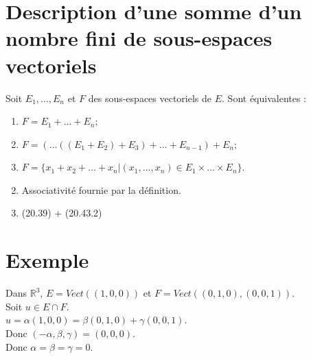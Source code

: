 \documentclass[../main.tex]{subfiles}
\begin{document}
\section{Description d'une somme d'un nombre fini de sous-espaces vectoriels}
\begin{tcolorbox}[title=Propostion 20.43, title filled=false, colframe=lightblue, colback=lightblue!10!white]
    Soit $E_1, \ldots, E_n$ et $F$ des sous-espaces vectoriels de $E$. Sont équivalentes : 
    \begin{enumerate}
        \item $F = E_1 + \ldots + E_n$;
        \item $F = (\ldots((E_1 + E_2) + E_3) + \ldots + E_{n-1}) + E_n$;
        \item $F = \{ x_1 + x_2 + \ldots + x_n | (x_1, \ldots, x_n) \in E_1 \times \ldots \times E_n \}$. 
    \end{enumerate}
\end{tcolorbox}

\begin{enumerate}
    \setcounter{enumi}{1}
    \item Associativité fournie par la définition. 
    \item (20.39) + (20.43.2)
\end{enumerate}

\section*{Exemple}
\noindent Dans $\mathbb{R}^3$, $E = Vect((1, 0, 0))$ et $F = Vect((0, 1, 0), (0, 0, 1))$. \\
Soit $u \in E \cap F$. \\
$u = \alpha(1, 0, 0) = \beta(0, 1, 0) + \gamma(0, 0, 1)$. \\
Donc $(-\alpha, \beta, \gamma) = (0, 0, 0)$. \\
Donc $\alpha = \beta = \gamma = 0$. \\ \\
\end{document}
